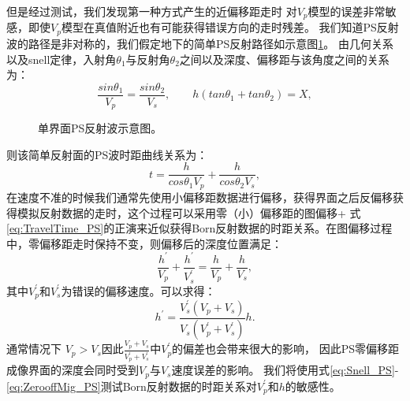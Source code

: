 但是经过测试，我们发现第一种方式产生的近偏移距走时
对$V_p$模型的误差非常敏感，即使$V_p$模型在真值附近也有可能获得错误方向的走时残差。
我们知道PS反射波的路径是非对称的，我们假定地下的简单PS反射路径如示意图\ref{fig:PS_refl}。
由几何关系以及snell定律，入射角$\theta_1$与反射角$\theta_2$之间以及深度、偏移距与该角度之间的关系为：
\begin{equation}
    \frac{sin\theta_1}{V_p}=\frac{sin\theta_2}{V_s},\qquad
    h(tan\theta_1+tan\theta_2)=X,
    \label{eq:Snell_PS} 
\end{equation}
\begin{figure}
   \centering
   \caption{单界面PS反射波示意图。}
   \label{fig:PS_refl}
\end{figure}
则该简单反射面的PS波时距曲线关系为：
\begin{equation}
	t=\frac{h}{cos\theta_1V_p}+\frac{h}{cos\theta_2V_s},
    \label{eq:TravelTime_PS} 
\end{equation}
在速度不准的时候我们通常先使用小偏移距数据进行偏移，获得界面之后反偏移获得模拟反射数据的走时，这个过程可以采用零（小）偏移距的图偏移+
式\ref{eq:TravelTime_PS}的正演来近似获得Born反射数据的时距关系。在图偏移过程中，零偏移距走时保持不变，则偏移后的深度位置满足：
\begin{equation}
	\frac{h^{'}}{V_p}+\frac{h^{'}}{V^{'}_s}=\frac{h}{V_p}+\frac{h}{V_s},
    \label{eq:Mapmigration_PS} 
\end{equation}
其中$V^{'}_p$和$V^{'}_s$为错误的偏移速度。可以求得：
\begin{equation}
	{h^{'}}=\frac{V^{'}_s(V_p+V_s)}{V_s(V^{'}_p+V^{'}_s)}h.
    \label{eq:ZerooffMig_PS} 
\end{equation}
通常情况下
$V_p>V_s$因此$\frac{V_p+V_s}{V^{'}_p+V^{'}_s}$中$V^{'}_p$的偏差也会带来很大的影响，
因此PS零偏移距成像界面的深度会同时受到$V_p$与$V_s$速度误差的影响。
我们将使用式\ref{eq:Snell_PS}-\ref{eq:ZerooffMig_PS}测试Born反射数据的时距关系对$V^{'}_p$和$h$的敏感性。
